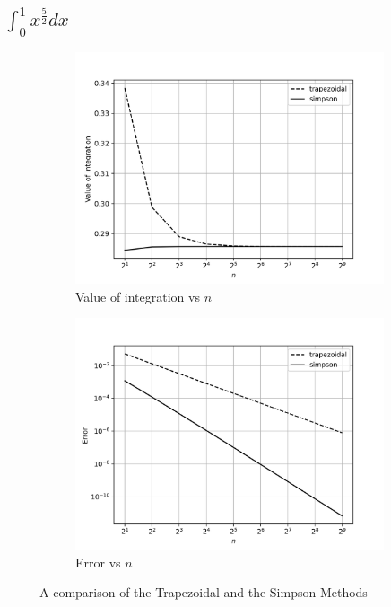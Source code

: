 \documentclass[12,a4paper]{article}
\begin{document}
    \subsection{$\int_0^1 x^{\frac{5}{2}} dx$}
    \begin{figure}[h!]
        \centering
        \begin{subfigure}[t]{0.49\textwidth}
            \includegraphics[width=\textwidth]{plots/q1c.png}
            \caption{Value of integration vs $n$}
            \label{fig:sq3a}
        \end{subfigure}
        \begin{subfigure}[t]{0.49\textwidth}
            \includegraphics[width=\textwidth]{plots/q1d.png}
            \caption{Error vs $n$}
            \label{fig:q3b}
        \end{subfigure}
        \caption{A comparison of the Trapezoidal and the Simpson Methods}
    \end{figure}
    
\end{document}
